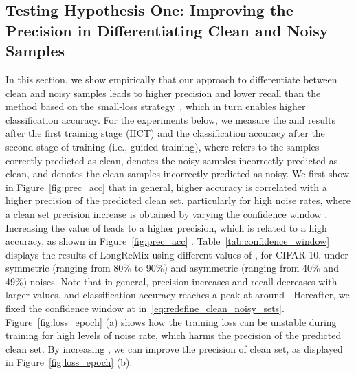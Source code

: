 \documentclass[review]{elsarticle}
\begin{document}
\subsection{Testing Hypothesis One: Improving the Precision in Differentiating Clean and Noisy Samples}
\label{sec:hypothesis_one_empirical_results}




In this section, we show empirically that our approach to differentiate between clean and noisy samples leads to higher precision and lower recall than the method based on the small-loss strategy~\cite{li2020dividemix}, which in turn enables higher classification accuracy.
For the experiments below, we measure the  and  results after the first training stage (HCT) and the classification accuracy after the second stage of training (i.e., guided training), where  refers to the samples correctly predicted as clean,   denotes the noisy samples incorrectly predicted as clean, and  denotes the clean samples incorrectly predicted as noisy.
We first show in Figure~\ref{fig:prec_acc} that in general, higher accuracy is correlated with a higher precision of the predicted clean set, particularly for high noise rates, where a clean set precision increase is obtained by varying the confidence window . Increasing the value of  leads to a higher precision, which is related to a high accuracy, as shown in Figure~\ref{fig:prec_acc} . Table~\ref{tab:confidence_window} displays the results of LongReMix using different values of , for CIFAR-10, under symmetric (ranging from 80\% to 90\%) and asymmetric (ranging from 40\% and 49\%) noises. Note that in general, precision increases and recall decreases with larger  values, and classification accuracy reaches a peak at around . Hereafter, we fixed the confidence window at  in~\eqref{eq:redefine_clean_noisy_sets}. Figure~\ref{fig:loss_epoch} (a) shows how the training loss can be unstable during training for high levels of noise rate, which harms the precision of the predicted clean set. By increasing , we can improve the precision of clean set, as displayed in Figure~\ref{fig:loss_epoch} (b).
\end{document}

